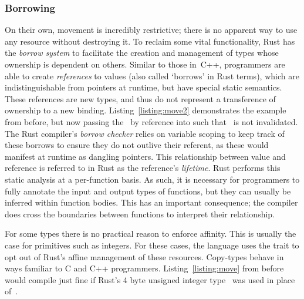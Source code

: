\subsubsection{Borrowing}

On their own, movement is incredibly restrictive; there is no apparent way to use any resource without destroying it. To reclaim some vital functionality, Rust has the \textit{borrow system} to facilitate the creation and management of types whose ownership is dependent on others. Similar to those in~C++, programmers are able to create \textit{references} to values (also called `borrows' in Rust terms), which are indistinguishable from pointers at runtime, but have special static semantics. These references are new types, and thus do not represent a transference of ownership to a new binding. Listing~\ref{listing:move2} demonstrates the example from before, but now passing the~ by reference into  such that~ is not invalidated. The Rust compiler's \textit{borrow checker} relies on variable scoping to keep track of these borrows to ensure they do not outlive their referent, as these would manifest at runtime as dangling pointers. This relationship between value and reference is referred to in Rust as the reference's \textit{lifetime}. Rust performs this static analysis at a per-function basis. As such, it is necessary for programmers to fully annotate the input and output types of functions, but they can usually be inferred within function bodies. This has an important consequence; the compiler does cross the boundaries between functions to interpret their relationship. 

For some types there is no practical reason to enforce affinity. This is usually the case for primitives such as integers. For these cases, the language uses the  trait to opt out of Rust's affine management of these resources. Copy-types behave in ways familiar to C and C++ programmers. Listing~\ref{listing:move} from before would compile just fine if Rust's 4 byte unsigned integer type~ was used in place of~.


